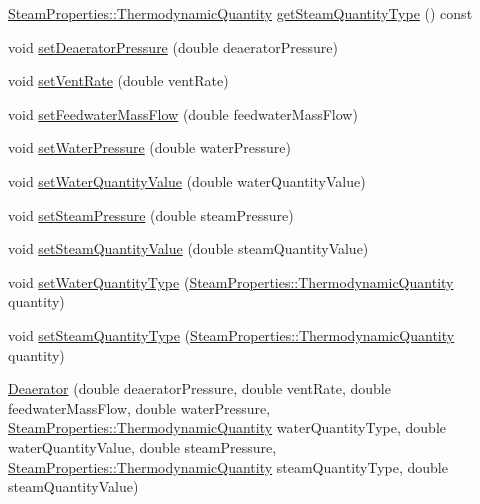 \begin{DoxyCompactItemize}
\item 
\hyperlink{class_steam_properties_ae0294bedf7d178c2d8fb6aed0f62fbff}{Steam\+Properties\+::\+Thermodynamic\+Quantity} \hyperlink{class_deaerator_a18abbdc5ec78f71e1d2495b0c64c77ec}{get\+Steam\+Quantity\+Type} () const
\item 
void \hyperlink{class_deaerator_a5b20d3aba98b21928cce70b45e843ff3}{set\+Deaerator\+Pressure} (double deaerator\+Pressure)
\item 
void \hyperlink{class_deaerator_a11e71194f58763a57ec0f7d05a21782d}{set\+Vent\+Rate} (double vent\+Rate)
\item 
void \hyperlink{class_deaerator_ada95cb2557bc43602d7bcefbad66c853}{set\+Feedwater\+Mass\+Flow} (double feedwater\+Mass\+Flow)
\item 
void \hyperlink{class_deaerator_ae23f64c6983daed388a73c033a15e176}{set\+Water\+Pressure} (double water\+Pressure)
\item 
void \hyperlink{class_deaerator_ac31cf2deb8bf30ee6921d1d9f8281eb8}{set\+Water\+Quantity\+Value} (double water\+Quantity\+Value)
\item 
void \hyperlink{class_deaerator_a5936221e68b5ba3245f0adabed74e6d7}{set\+Steam\+Pressure} (double steam\+Pressure)
\item 
void \hyperlink{class_deaerator_a101399a8b66c3ff1fecf884fd1b1373d}{set\+Steam\+Quantity\+Value} (double steam\+Quantity\+Value)
\item 
void \hyperlink{class_deaerator_ac60ad3d6650ed6c7783d18833bb7e3dd}{set\+Water\+Quantity\+Type} (\hyperlink{class_steam_properties_ae0294bedf7d178c2d8fb6aed0f62fbff}{Steam\+Properties\+::\+Thermodynamic\+Quantity} quantity)
\item 
void \hyperlink{class_deaerator_a1aa3b3de064d148479af9576e717b6c2}{set\+Steam\+Quantity\+Type} (\hyperlink{class_steam_properties_ae0294bedf7d178c2d8fb6aed0f62fbff}{Steam\+Properties\+::\+Thermodynamic\+Quantity} quantity)
\item 
\hyperlink{class_deaerator_a02311c34cbe46384187292e5f844984c}{Deaerator} (double deaerator\+Pressure, double vent\+Rate, double feedwater\+Mass\+Flow, double water\+Pressure, \hyperlink{class_steam_properties_ae0294bedf7d178c2d8fb6aed0f62fbff}{Steam\+Properties\+::\+Thermodynamic\+Quantity} water\+Quantity\+Type, double water\+Quantity\+Value, double steam\+Pressure, \hyperlink{class_steam_properties_ae0294bedf7d178c2d8fb6aed0f62fbff}{Steam\+Properties\+::\+Thermodynamic\+Quantity} steam\+Quantity\+Type, double steam\+Quantity\+Value)
\item 

\end{DoxyCompactItemize}
